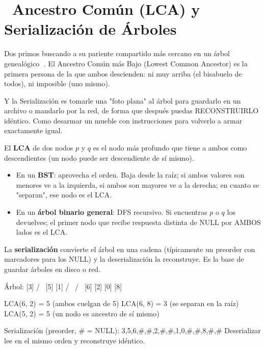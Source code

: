 \chapter[\emj{🧬}~LCA y Serialización de Árboles]{~Ancestro Común (LCA) y Serialización de Árboles}

\begin{dsaquees}

Dos primos buscando a su pariente compartido más cercano en un árbol
genealógico 🌳. El Ancestro Común más Bajo (Lowest Common Ancestor) es
la primera persona de la que ambos descienden: ni muy arriba (el
bisabuelo de todos), ni imposible (uno mismo).

Y la Serialización es tomarle una "foto plana" al árbol para guardarlo
en un archivo o mandarlo por la red, de forma que después puedas
RECONSTRUIRLO idéntico. Como desarmar un mueble con instrucciones para
volverlo a armar exactamente igual.

\end{dsaquees}

\begin{dsaotraforma}

El \textbf{LCA} de dos nodos $p$ y $q$ es el nodo más profundo que tiene
a ambos como descendientes (un nodo puede ser descendiente de sí mismo).

\begin{itemize}
\item En un \textbf{BST}: aprovecha el orden. Baja desde la raíz; si
      ambos valores son menores ve a la izquierda, si ambos son mayores
      ve a la derecha; en cuanto se "separan", ese nodo es el LCA.
\item En un \textbf{árbol binario general}: DFS recursivo. Si encuentras
      $p$ o $q$ los devuelves; el primer nodo que recibe respuesta
      distinta de NULL por AMBOS lados es el LCA.
\end{itemize}

La \textbf{serialización} convierte el árbol en una cadena (típicamente
un preorder con marcadores para los NULL) y la deserialización la
reconstruye. Es la base de guardar árboles en disco o red.

\end{dsaotraforma}

\begin{dsadiagrama}
Árbol:
           [3]
         /     \
       [5]     [1]
      /   \    /  \
    [6]  [2] [0]  [8]

LCA(6, 2) = 5     (ambos cuelgan de 5)
LCA(6, 8) = 3     (se separan en la raíz)
LCA(5, 2) = 5     (un nodo es ancestro de sí mismo)

Serialización (preorder, # = NULL):
  3,5,6,#,#,2,#,#,1,0,#,#,8,#,#
Deserializar lee en el mismo orden y reconstruye idéntico.
\end{dsadiagrama}

